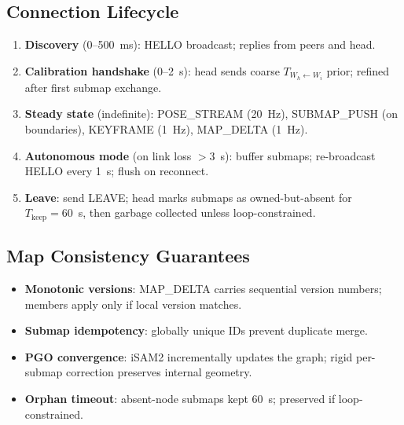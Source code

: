 \subsection{Connection Lifecycle}

\begin{enumerate}
  \item \textbf{Discovery} (0--500~ms): HELLO broadcast; replies from peers
    and head.
  \item \textbf{Calibration handshake} (0--2~s): head sends coarse
    $T_{W_h\leftarrow W_i}$ prior; refined after first submap exchange.
  \item \textbf{Steady state} (indefinite): POSE\_STREAM (20~Hz),
    SUBMAP\_PUSH (on boundaries), KEYFRAME (1~Hz), MAP\_DELTA (1~Hz).
  \item \textbf{Autonomous mode} (on link loss $>$3~s): buffer submaps;
    re-broadcast HELLO every 1~s; flush on reconnect.
  \item \textbf{Leave}: send LEAVE; head marks submaps as
    owned-but-absent for $T_{\text{keep}}=60$~s, then garbage collected
    unless loop-constrained.
\end{enumerate}

\subsection{Map Consistency Guarantees}

\begin{itemize}
  \item \textbf{Monotonic versions}: MAP\_DELTA carries sequential version
    numbers; members apply only if local version matches.
  \item \textbf{Submap idempotency}: globally unique IDs prevent duplicate
    merge.
  \item \textbf{PGO convergence}: iSAM2 incrementally updates the graph;
    rigid per-submap correction preserves internal geometry.
  \item \textbf{Orphan timeout}: absent-node submaps kept 60~s; preserved
    if loop-constrained.
\end{itemize}
